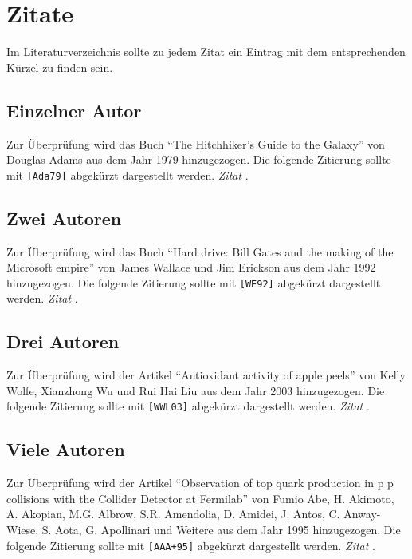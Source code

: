 \section{Zitate}

Im Literaturverzeichnis sollte zu jedem Zitat ein Eintrag mit dem entsprechenden Kürzel zu finden sein.

\subsection{Einzelner Autor}

Zur Überprüfung wird das Buch \enquote{The Hitchhiker's Guide to the Galaxy}  von Douglas Adams aus dem Jahr 1979 hinzugezogen. Die folgende Zitierung sollte mit \texttt{[Ada79]}  abgekürzt dargestellt werden. \textit{Zitat} \cite{TestCitation001}.

\subsection{Zwei Autoren}

Zur Überprüfung wird das Buch \enquote{Hard drive: Bill Gates and the making of the Microsoft empire} von James Wallace und Jim Erickson aus dem Jahr 1992 hinzugezogen. Die folgende Zitierung sollte mit \texttt{[WE92]} abgekürzt dargestellt werden. \textit{Zitat} \cite{TestCitation002}.

\subsection{Drei Autoren}

Zur Überprüfung wird der Artikel \enquote{Antioxidant activity of apple peels} von Kelly Wolfe, Xianzhong Wu und Rui Hai Liu aus dem Jahr 2003 hinzugezogen. Die folgende Zitierung sollte mit \texttt{[WWL03]} abgekürzt dargestellt werden. \textit{Zitat} \cite{TestCitation003}.

\subsection{Viele Autoren}

Zur Überprüfung wird der Artikel \enquote{Observation of top quark production in p p collisions with the Collider Detector at Fermilab} von Fumio Abe, H. Akimoto, A. Akopian, M.G. Albrow, S.R. Amendolia, D. Amidei, J. Antos, C. Anway-Wiese, S. Aota, G. Apollinari und Weitere aus dem Jahr 1995 hinzugezogen. Die folgende Zitierung sollte mit \texttt{[AAA+95]} abgekürzt dargestellt werden. \textit{Zitat} \cite{TestCitation004}.

